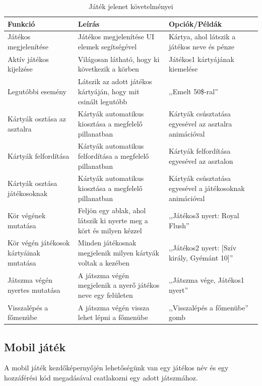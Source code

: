 \documentclass[]{thesis-ekf}
\theoremstyle{definition}
\theoremstyle{remark}
\begin{document}
\begin{table}[ht!]
	\centering
	\footnotesize
	\begin{tabular}{|p{4cm}|p{7cm}|p{4cm}|}
		\hline
		\textbf{Funkció} & \textbf{Leírás} & \textbf{Opciók/Példák} \\ 
		\hline
		Játékos megjelenítése & Játékos megjelenítése UI elemek segítségével & Kártya, ahol látszik a játékos neve és pénze \\
		\hline
		Aktív játékos kijelzése & Világosan látható, hogy ki következik a körben & Játékos1 kártyájának kiemelése \\ 
		\hline
		Legutóbbi esemény & Látszik az adott játékos kártyáján, hogy mit csinált legutóbb & ,,Emelt 50\$-ral'' \\
		\hline
		Kártyák osztása az asztalra & Kártyák automatikus kiosztása a megfelelő pillanatban & Kártyák csúsztatása egyesével az asztalra animációval \\ 
		\hline
		Kártyák felfordítása & Kártyák automatikus felfordítása a megfelelő pillanatban & Kártyák felfordítása egyesével az asztalon \\ 
		\hline
		Kártyák osztása játékosoknak & Kártyák automatikus kiosztása a megfelelő pillanatban & Kártyák csúsztatása egyesével a játékosoknak animációval \\ 
		\hline
		Kör végének mutatása & Feljön egy ablak, ahol látszik ki nyerte meg a kört és milyen kézzel & ,,Játékos3 nyert: Royal Flush'' \\
		\hline
		Kör végén játékosok kártyáinak mutatása & Minden játékosnak megjelenik milyen kártyák voltak a kezében & ,,Játékos2 nyert: [Szív király, Gyémánt 10]'' \\
		\hline
		Játszma végén nyertes mutatása & A játszma végén megjelenik a nyerő játékos neve egy felületen & ,,Játszma vége, Játékos1 nyert'' \\
		\hline
		Visszalépés a főmenübe & A játszma végén vissza lehet lépni a főmenübe & ,,Visszalépés a főmenübe'' gomb \\
		\hline
	\end{tabular}
	\caption{Játék jelenet követelményei}
\end{table}

\subsection{Mobil játék}

A mobil játék kezdőképernyőjén lehetőségünk van egy játékos név és egy hozzáférési kód megadásával csatlakozni egy adott játszmához.
\end{document}
